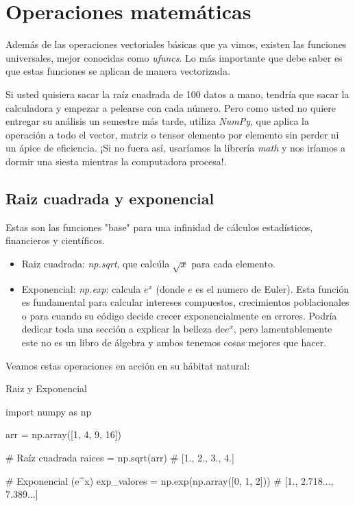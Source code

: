 \section{Operaciones matemáticas}

Además de las operaciones vectoriales básicas que ya vimos, existen las funciones universales, mejor conocidas como \textit{ufuncs}. Lo más importante que debe saber es que estas funciones se aplican de manera vectorizada.

Si usted quisiera sacar la raíz cuadrada de 100 datos a mano, tendría que sacar la calculadora y empezar a pelearse con cada número. Pero como usted no quiere entregar su análisis un semestre más tarde, utiliza \textit{NumPy}, que aplica la operación a todo el vector, matriz o tensor elemento por elemento sin perder ni un ápice de eficiencia. ¡Si no fuera así, usaríamos la librería \textit{math} y nos iríamos a dormir una siesta mientras la computadora procesa!.

\subsection{Raiz cuadrada y exponencial}

Estas son las funciones "base" para una infinidad de cálculos estadísticos, financieros y científicos.
\begin{itemize}
    \item Raiz cuadrada: \textit{np.sqrt}, que calcúla \(\sqrt{x}\) para cada elemento.
    \item Exponencial: \textit{np.exp}: calcula \(e^x\) (donde \(e\) es el numero de Euler). Esta función es fundamental para calcular intereses compuestos, crecimientos poblacionales o para cuando su código decide crecer exponencialmente en errores. Podría dedicar toda una sección a explicar la belleza de\(e^x\), pero lamentablemente este no es un libro de álgebra y ambos tenemos cosas mejores que hacer.
\end{itemize}

Veamos estas operaciones en acción en su hábitat natural:
\begin{pycode}{Raiz y Exponencial}

import numpy as np

arr = np.array([1, 4, 9, 16])

# Raíz cuadrada
raices = np.sqrt(arr) # [1., 2., 3., 4.]

# Exponencial (e^x)
exp_valores = np.exp(np.array([0, 1, 2])) # [1., 2.718..., 7.389...]

\end{pycode}

